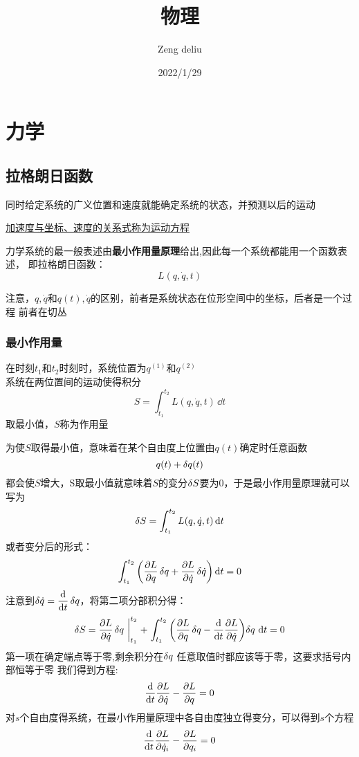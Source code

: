 \documentclass[12pt]{report}
\newcommand{\dotq}{\dot{q}}
\newcommand{\Lagfunc}{L(q,\dot{q},t)}
\newcommand{\Lageq}{\dv{t}\pdv{L}{\dotq _i}-\pdv{L}{q_i} =0}
\begin{document}
    \title{物理}
    \date{2022/1/29}
    \author{Zeng deliu}
    \maketitle
    \tableofcontents{}
\chapter{力学}
\section{拉格朗日函数}
同时给定系统的广义位置和速度就能确定系统的状态，并预测以后的运动
\par\underline{加速度与坐标、速度的关系式称为运动方程}\par
力学系统的最一般表述由\textbf{最小作用量原理}给出,因此每一个系统都能用一个函数表述，
即拉格朗日函数：
$$\Lagfunc$$

注意，$q,\dot{q}$和$q(t),\dot{q}$的区别，前者是系统状态在位形空间中的坐标，后者是一个过程
前者在切丛
\subsection{最小作用量}
在时刻$t_1$和$t_2$时刻时，系统位置为$q^{(1)}$和$q^{(2)}$\\
系统在两位置间的运动使得积分
\begin{equation}
    S =\int_{t_1}^{t_2} L(q,\dot{q},t) \,\dd t
    \label{作用量}
\end{equation}
取最小值，$S$称为作用量\par
为使$S$取得最小值，意味着在某个自由度上位置由$q(t)$确定时任意函数
$$q(t)+\var{q(t)}$$
都会使$S$增大，S取最小值就意味着$S$的变分$\var{S}$要为0，于是最小作用量原理就可以写为
$$\var{S} = \int_{t_1}^{t_2} L(q,\dot{q},t) \,\dd t$$
或者变分后的形式：
$$\int_{t_1}^{t_2} 
\left(\pdv{L}{q}\var{q}
 +\pdv{L}{\dot{q}}\var{\dot{q}}\right) \dd t =0$$ 
注意到$\var{\dot{q}}=\displaystyle{\dv{t}}\var{q}$，将第二项分部积分得：
$$\var{S}=\pdv{L}{\dot{q}}\var{q}\,\bigg|_{t_1}^{t_2}
\mathrel{+}\int_{t_1}^{t_2} \left( \pdv{L}{q}\var{q}
 -\dv{t}\pdv{L}{\dot{q}}\right)\!\var{q}\,\dd t =0$$
第一项在确定端点等于零,剩余积分在$\var{q}$ 任意取值时都应该等于零，这要求括号内部恒等于零
我们得到方程:
\begin{equation}
    \dv{t}\pdv{L}{\dot{q}}-\pdv{L}{q} =0 \label{lagrange方程单自由度}
\end{equation}
对$s$个自由度得系统，在最小作用量原理中各自由度独立得变分，可以得到$s$个方程
\begin{equation}
    \Lageq \label{lagrange方程s自由度}
\end{equation}
\end{document}
